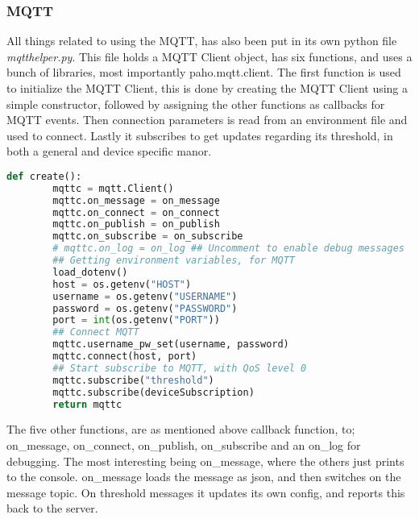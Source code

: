 \subsubsection*{MQTT}
All things related to using the MQTT, has also been put in its own python file \textit{mqtthelper.py}. This file holds a MQTT Client object, has six functions, and uses a bunch of libraries, most importantly paho.mqtt.client. The first function is used to initialize the MQTT Client, this is done by creating the MQTT Client using a simple constructor, followed by assigning the other functions as callbacks for MQTT events. Then connection parameters is read from an environment file and used to connect. Lastly it subscribes to get updates regarding its threshold, in both a general and device specific manor.
\begin{lstlisting}[language=Python, caption=Python MQTT setup, label={lst:rpmqtt}, basicstyle=\scriptsize]
    def create():
        mqttc = mqtt.Client()
        mqttc.on_message = on_message
        mqttc.on_connect = on_connect
        mqttc.on_publish = on_publish
        mqttc.on_subscribe = on_subscribe
        # mqttc.on_log = on_log ## Uncomment to enable debug messages
        ## Getting environment variables, for MQTT
        load_dotenv()
        host = os.getenv("HOST")
        username = os.getenv("USERNAME")
        password = os.getenv("PASSWORD")
        port = int(os.getenv("PORT"))
        ## Connect MQTT
        mqttc.username_pw_set(username, password)
        mqttc.connect(host, port)
        ## Start subscribe to MQTT, with QoS level 0
        mqttc.subscribe("threshold")
        mqttc.subscribe(deviceSubscription)
        return mqttc
\end{lstlisting}
The five other functions, are as mentioned above callback function, to; on\_message, on\_connect, on\_publish, on\_subscribe and an on\_log for debugging. The most interesting being on\_message, where the others just prints to the console. on\_message loads the message as json, and then switches on the message topic. On threshold messages it updates its own config, and reports this back to the server.
